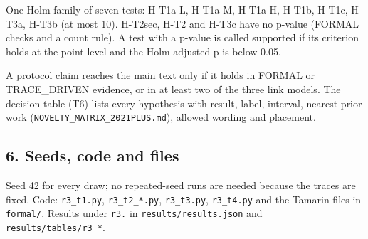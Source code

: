 One Holm family of seven tests: H-T1a-L, H-T1a-M, H-T1a-H, H-T1b, H-T1c, H-T3a, H-T3b (at most 10). H-T2sec, H-T2 and H-T3c have no p-value (FORMAL checks and a count rule). A test with a p-value is called supported if its criterion holds at the point level and the Holm-adjusted p is below 0.05.

A protocol claim reaches the main text only if it holds in FORMAL or TRACE\_DRIVEN evidence, or in at least two of the three link models. The decision table (T6) lists every hypothesis with result, label, interval, nearest prior work (\texttt{NOVELTY\_MATRIX\_2021PLUS.md}), allowed wording and placement.

\subsection*{6. Seeds, code and files}

Seed 42 for every draw; no repeated-seed runs are needed because the traces are fixed. Code: \texttt{r3\_t1.py}, \texttt{r3\_t2\_*.py}, \texttt{r3\_t3.py}, \texttt{r3\_t4.py} and the Tamarin files in \texttt{formal/}. Results under \texttt{r3.} in \texttt{results/results.json} and \texttt{results/tables/r3\_*}.

